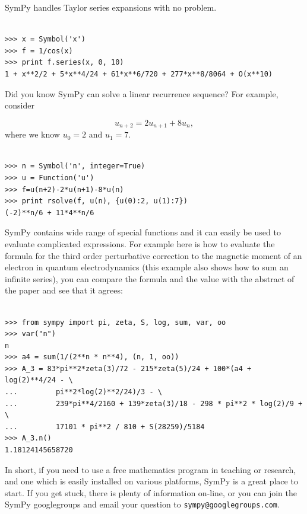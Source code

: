 \documentclass[12pt]{article}
\begin{document}
SymPy handles Taylor series expansions with no problem.

\begin{Verbatim}[fontsize=\scriptsize,fontfamily=courier,fontshape=tt,frame=single,label=SymPy]

>>> x = Symbol('x')
>>> f = 1/cos(x)
>>> print f.series(x, 0, 10)
1 + x**2/2 + 5*x**4/24 + 61*x**6/720 + 277*x**8/8064 + O(x**10)

\end{Verbatim}

Did you know SymPy can solve a linear recurrence sequence?
For example, consider

\[
 u_{n+2} = 2  u_{n+1} + 8  u_{n}, 
\]
where we know $u_{0} = 2$ and $u_{1} = 7$.

\begin{Verbatim}[fontsize=\scriptsize,fontfamily=courier,fontshape=tt,frame=single,label=SymPy]

>>> n = Symbol('n', integer=True)
>>> u = Function('u')
>>> f=u(n+2)-2*u(n+1)-8*u(n)
>>> print rsolve(f, u(n), {u(0):2, u(1):7})
(-2)**n/6 + 11*4**n/6

\end{Verbatim}

SymPy contains wide range of special functions and it can easily be used to
evaluate complicated expressions. For example here is how to evaluate the
formula for the third order perturbative correction to the
magnetic moment of an electron in quantum electrodynamics (this example also
shows how to sum an infinite series), you can compare the formula and the value
with the abstract of the paper \cite{QED} and see that it agrees:

\begin{Verbatim}[fontsize=\scriptsize,fontfamily=courier,fontshape=tt,frame=single,label=SymPy]

>>> from sympy import pi, zeta, S, log, sum, var, oo
>>> var("n")
n
>>> a4 = sum(1/(2**n * n**4), (n, 1, oo))
>>> A_3 = 83*pi**2*zeta(3)/72 - 215*zeta(5)/24 + 100*(a4 + log(2)**4/24 - \
...         pi**2*log(2)**2/24)/3 - \
...         239*pi**4/2160 + 139*zeta(3)/18 - 298 * pi**2 * log(2)/9 + \
...         17101 * pi**2 / 810 + S(28259)/5184
>>> A_3.n()
1.18124145658720

\end{Verbatim}

\vskip 0.3in

In short, if you need to use a free mathematics program in teaching or
research, and one which is easily installed on various platforms,
SymPy is a great place to start. If you get stuck, there is plenty of
information
on-line, or you can join the SymPy googlegroups and
email your question to {\tt sympy@googlegroups.com}.
\end{document}
